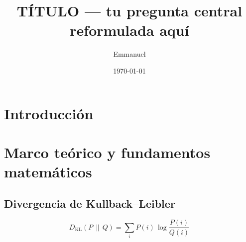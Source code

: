 \documentclass[11pt,a4paper]{article}
\title{\textbf{TÍTULO — tu pregunta central reformulada aquí}}
\author{Emmanuel}
\date{\today}
\begin{document}
\maketitle

\begin{abstract}
\end{abstract}

\section{Introducción}

\section{Marco teórico y fundamentos matemáticos}

\subsection{Divergencia de Kullback--Leibler}
%
\begin{equation}
    D_{\mathrm{KL}}(P \,\|\, Q) = \sum_{i} P(i) \, \log \frac{P(i)}{Q(i)}
    \label{eq:kl}
\end{equation}
\end{document}
